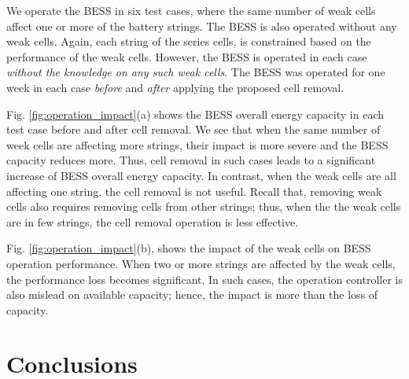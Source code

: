 \documentclass[10pt,twocolumn]{IEEEtran}
\begin{document}
We operate the BESS in six  test cases, where the same number of weak cells  affect  one  or more of the battery strings. %
The  BESS is also operated without any weak cells.
Again, each string of the series cells, is constrained based on the performance of the weak cells.
However, the BESS is operated in each case \emph{without the knowledge on any such weak cells}. 
The BESS was operated for one week in each case \emph{before} and \emph{after} applying the proposed cell removal.
%

Fig. \ref{fig:operation_impact}(a) shows the BESS overall energy capacity in each test case before and after cell removal.
We see that when the same number of week cells are affecting more strings, their impact is more severe and the BESS capacity reduces more.
Thus,  cell removal in such  cases  leads to a significant increase of BESS overall energy capacity.
In contrast, when the weak cells are all affecting one string, the cell removal is not  useful.
 Recall  that, removing weak cells also requires  removing cells from other strings; thus,  when the the weak cells are in few strings, the cell removal operation is less effective. 

Fig. \ref{fig:operation_impact}(b), shows the impact of the weak cells  on BESS  operation performance.
  When two or more  strings are affected by the weak cells, the performance loss becomes significant. 
  In such cases, the operation controller  is also mislead on available capacity; hence,  the impact is more than the loss of  capacity.



\vspace{-0.3cm}

\section{Conclusions}
\end{document}
